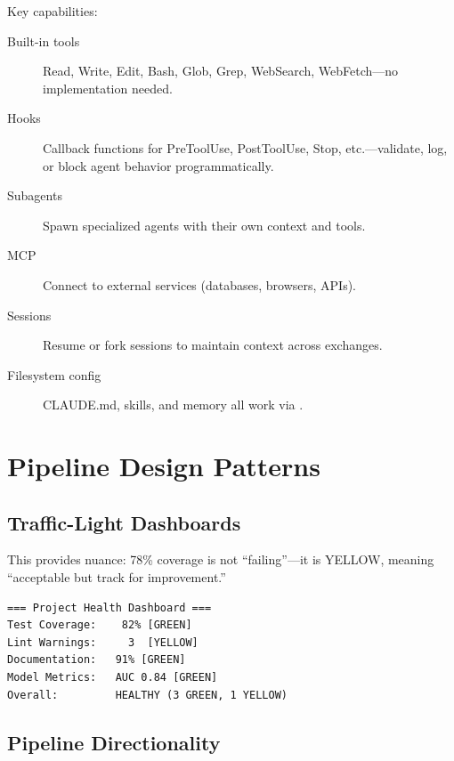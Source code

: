 Key capabilities:
\begin{description}
  \item[Built-in tools] Read, Write, Edit, Bash, Glob, Grep, WebSearch, WebFetch---no
    implementation needed.
  \item[Hooks] Callback functions for PreToolUse, PostToolUse, Stop, etc.---validate,
    log, or block agent behavior programmatically.
  \item[Subagents] Spawn specialized agents with their own context and tools.
  \item[MCP] Connect to external services (databases, browsers, APIs).
  \item[Sessions] Resume or fork sessions to maintain context across exchanges.
  \item[Filesystem config] CLAUDE.md, skills, and memory all work via
    .
\end{description}


\section{Pipeline Design Patterns}
\label{sec:pipeline-patterns}

\subsection{Traffic-Light Dashboards}

This provides nuance: 78\% coverage is not ``failing''---it is
YELLOW, meaning ``acceptable but track for improvement.''

\begin{verbatim}
=== Project Health Dashboard ===
Test Coverage:    82% [GREEN]
Lint Warnings:     3  [YELLOW]
Documentation:   91% [GREEN]
Model Metrics:   AUC 0.84 [GREEN]
Overall:         HEALTHY (3 GREEN, 1 YELLOW)
\end{verbatim}

\subsection{Pipeline Directionality}


